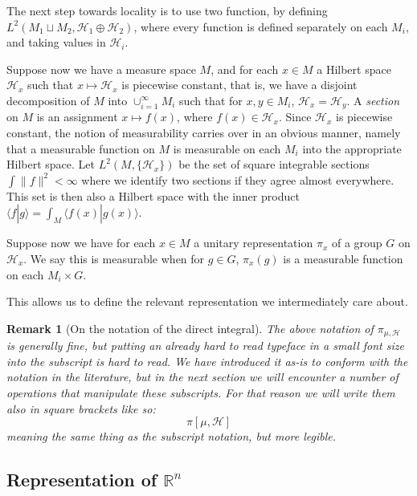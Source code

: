 \documentclass[
  12pt
]{article}
\numberwithin{equation}{section}
\theoremstyle{plain}
\newtheorem*{rk}{Remark}
\newcommand{\bbr}{\ensuremath{\mathbb{R}}\xspace}
\newcommand{\hilb}{\ensuremath{\mathscr{H}}\xspace}
\begin{document}

  The next step towards locality is to use two function, by defining
  $L^2(M_1 \sqcup M_2, \mathscr{H}_1 \oplus \mathscr{H}_2)$, where every
  function is defined separately on each $M_i$, and taking values in
  $\mathscr{H}_i$.


  Suppose now we have a measure space $M$, and for each $x \in M$ a
  Hilbert space $\mathscr{H}_x$ such that $x \mapsto \mathscr{H}_x$ is
  piecewise constant, that is, we have a disjoint decomposition of $M$
  into $\cup_{i=1}^{\infty} M_i$ such that for $x,y \in M_i$,
  $\mathscr{H}_x = \mathscr{H}_y$. 
  A \emph{section} on $M$ is an assignment $x \mapsto f(x)$, where
  $f(x) \in \mathscr{H}_x$. Since $\mathscr{H}_x$ is piecewise
  constant, the notion of measurability carries over in an obvious manner,
  namely that a measurable function on $M$ is measurable on each $M_i$
  into the appropriate Hilbert space. Let $L^2(M, \{\mathscr{H}_x\})$ be
  the set of square integrable sections $\int \| f \|^2 < \infty$ where
  we identify two sections if they agree almost everywhere. This set is
  then also a Hilbert space with the inner product
  $\langle f | g \rangle = \int_M \langle f(x) | g(x) \rangle$.

  Suppose now we have for each $x \in M$ a unitary representation
  $\pi_x$ of a group $G$ on $\mathscr{H}_x$. We say this is
  measurable when for $g \in G$, $\pi_x(g)$ is a measurable function
  on each $M_i \times G$.

  This allows us to define the relevant representation we intermediately
  care about.

  \begin{rk}[On the notation of the direct integral]
    \label{rem:integral-notation}
    The above notation of $\pi_{\mu, \hilb}$ is generally fine, but putting an
    already hard to read typeface in a small font size into the subscript is
    hard to read. We have introduced it as-is to conform with the notation in
    the literature, but in the next section we will encounter a number of
    operations that manipulate these subscripts. For that reason we will write
    them also in square brackets like so:
    $$
    \pi[\mu, \hilb]
    $$
    meaning the same thing as the subscript notation, but more legible.
  \end{rk}



  \hypertarget{representation-of-rn}{%
  \subsection{Representation of \texorpdfstring{$\bbr^n$}{R\^{}n}}\label{representation-of-rn}}
\end{document}
